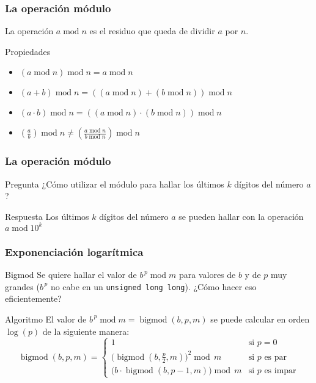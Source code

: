 \documentclass{beamer}
\begin{document}
	\begin{frame}
		\frametitle{La operación módulo}
		La operación $a \operatorname{mod} n$ es el residuo que queda de dividir $a$ por $n$.
		\begin{block}{Propiedades}
			\begin{itemize}
				\item $(a \operatorname{mod} n) \operatorname{mod} n = a \operatorname{mod} n$
				\item $(a + b) \operatorname{mod} n = ((a \operatorname{mod} n) + (b\operatorname{mod} n)) \operatorname{mod} n$
				\item $(a \cdot b) \operatorname{mod} n = ((a \operatorname{mod} n) \cdot (b\operatorname{mod} n)) \operatorname{mod} n$
				\item $\displaystyle\left(\frac{a}{b} \right) \operatorname{mod} n \neq \left(\frac{a \operatorname{mod} n}{b\operatorname{mod} n}\right) \operatorname{mod} n$
			\end{itemize}
		\end{block}
	\end{frame}
	
	\begin{frame}
		\frametitle{La operación módulo}
		\begin{alertblock}{Pregunta}
			¿Cómo utilizar el módulo para hallar los últimos $k$ dígitos del número $a$?
		\end{alertblock}
		\pause
		\begin{exampleblock}{Respuesta}
			Los últimos $k$ dígitos del número $a$ se pueden hallar con la operación $a \operatorname{mod} 10^k$
		\end{exampleblock}
	\end{frame}

	\begin{frame}[fragile]
		\frametitle{Exponenciación logarítmica}
		\begin{alertblock}{Bigmod}
			Se quiere hallar el valor de $b^{\,p} \operatorname{mod} m$ para valores de $b$ y de $p$ muy grandes ($b^{\,p}$ no cabe en un \verb|unsigned long long|).
			¿Cómo hacer eso eficientemente?
		\end{alertblock}
		\pause
		\begin{exampleblock}{Algoritmo}
			El valor de $b^{\,p} \operatorname{mod} m = \operatorname{bigmod}(b, p, m)$ se puede calcular en orden $\operatorname{log}(p)$ de la siguiente manera:
			$$ \operatorname{bigmod}(b, p, m) =
			\begin{cases}
				1    & \text{si } p = 0\\
				\big(\operatorname{bigmod}(b, \frac{p}{2}, m)\big)^2 \operatorname{mod} \,m &  \text{si } p \text{ es par}\\
				\big(b \cdot \operatorname{bigmod}(b, p-1, m)\big)   \operatorname{mod} \,m &  \text{si } p \text{ es impar}
			\end{cases}$$
		\end{exampleblock}
	\end{frame}
\end{document}
